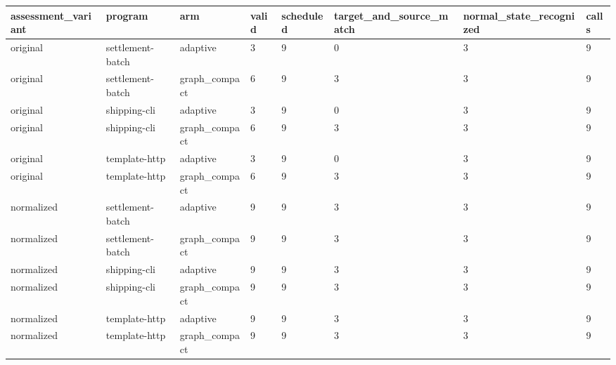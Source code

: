 \begin{tabular}{llllllll}
assessment\_variant & program & arm & valid & scheduled & target\_and\_source\_match & normal\_state\_recognized & calls \\
\hline
original & settlement-batch & adaptive & 3 & 9 & 0 & 3 & 9 \\
original & settlement-batch & graph\_compact & 6 & 9 & 3 & 3 & 9 \\
original & shipping-cli & adaptive & 3 & 9 & 0 & 3 & 9 \\
original & shipping-cli & graph\_compact & 6 & 9 & 3 & 3 & 9 \\
original & template-http & adaptive & 3 & 9 & 0 & 3 & 9 \\
original & template-http & graph\_compact & 6 & 9 & 3 & 3 & 9 \\
normalized & settlement-batch & adaptive & 9 & 9 & 3 & 3 & 9 \\
normalized & settlement-batch & graph\_compact & 9 & 9 & 3 & 3 & 9 \\
normalized & shipping-cli & adaptive & 9 & 9 & 3 & 3 & 9 \\
normalized & shipping-cli & graph\_compact & 9 & 9 & 3 & 3 & 9 \\
normalized & template-http & adaptive & 9 & 9 & 3 & 3 & 9 \\
normalized & template-http & graph\_compact & 9 & 9 & 3 & 3 & 9 \\
\end{tabular}
